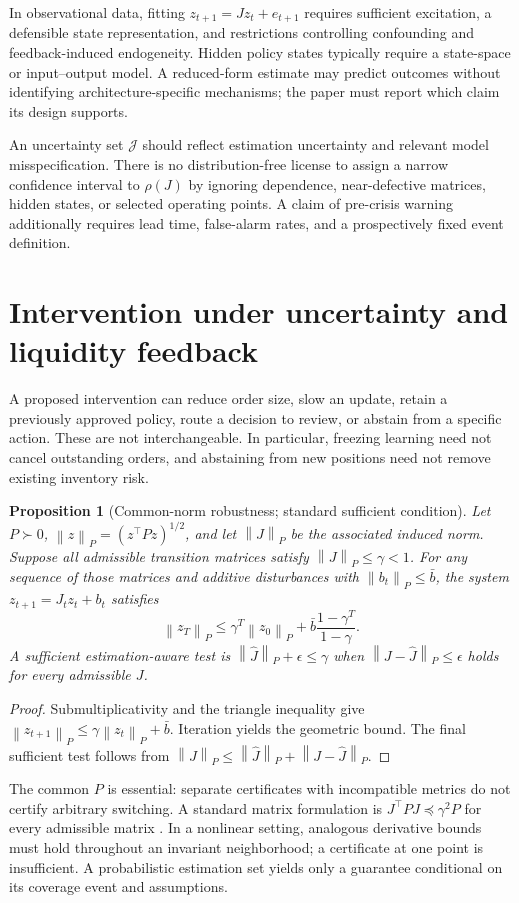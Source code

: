 \documentclass[11pt,a4paper]{article}
\newtheorem{proposition}[theorem]{Proposition}
\theoremstyle{definition}
\theoremstyle{remark}
\newcommand{\norm}[1]{\left\lVert #1\right\rVert}
\begin{document}
In observational data, fitting $z_{t+1}=Jz_t+e_{t+1}$ requires sufficient excitation, a defensible state representation, and restrictions controlling confounding and feedback-induced endogeneity. Hidden policy states typically require a state-space or input--output model. A reduced-form estimate may predict outcomes without identifying architecture-specific mechanisms; the paper must report which claim its design supports.

An uncertainty set $\mathcal J$ should reflect estimation uncertainty and relevant model misspecification. There is no distribution-free license to assign a narrow confidence interval to $\rho(J)$ by ignoring dependence, near-defective matrices, hidden states, or selected operating points. A claim of pre-crisis warning additionally requires lead time, false-alarm rates, and a prospectively fixed event definition.

\section{Intervention under uncertainty and liquidity feedback}
\label{sec:intervention}
A proposed intervention can reduce order size, slow an update, retain a previously approved policy, route a decision to review, or abstain from a specific action. These are not interchangeable. In particular, freezing learning need not cancel outstanding orders, and abstaining from new positions need not remove existing inventory risk.

\begin{proposition}[Common-norm robustness; standard sufficient condition]
\label{prop:robust}
Let $P\succ0$, $\norm{z}_P=(z^\top Pz)^{1/2}$, and let $\norm{J}_P$ be the associated induced norm. Suppose all admissible transition matrices satisfy $\norm{J}_P\leq\gamma<1$. For any sequence of those matrices and additive disturbances with $\norm{b_t}_P\leq\bar b$, the system $z_{t+1}=J_tz_t+b_t$ satisfies
\begin{equation}
 \norm{z_T}_P\leq\gamma^T\norm{z_0}_P+
 \bar b\frac{1-\gamma^T}{1-\gamma}.
 \label{eq:robustbound}
\end{equation}
A sufficient estimation-aware test is $\norm{\widehat J}_P+\epsilon\leq\gamma$ when $\norm{J-\widehat J}_P\leq\epsilon$ holds for every admissible $J$.
\end{proposition}
\begin{proof}
Submultiplicativity and the triangle inequality give $\norm{z_{t+1}}_P\leq\gamma\norm{z_t}_P+\bar b$. Iteration yields the geometric bound. The final sufficient test follows from $\norm{J}_P\leq\norm{\widehat J}_P+\norm{J-\widehat J}_P$.
\end{proof}
The common $P$ is essential: separate certificates with incompatible metrics do not certify arbitrary switching. A standard matrix formulation is $J^\top PJ\preceq\gamma^2P$ for every admissible matrix \citep{boyd1994}. In a nonlinear setting, analogous derivative bounds must hold throughout an invariant neighborhood; a certificate at one point is insufficient. A probabilistic estimation set yields only a guarantee conditional on its coverage event and assumptions.
\end{document}
